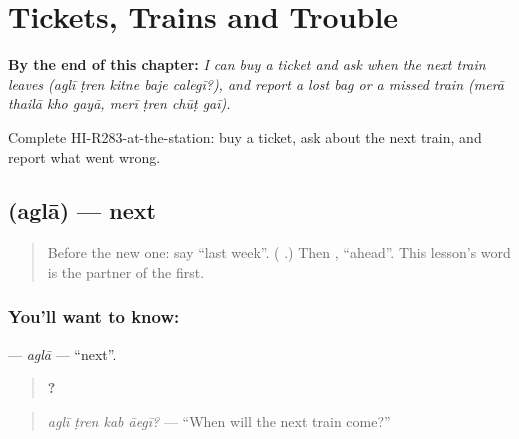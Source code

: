 
\chapter{Tickets, Trains and Trouble}
\label{ch:hi-tickets-trains-and-trouble}

\begin{chapteropening}
\textbf{By the end of this chapter:} \emph{I can buy a ticket and ask when the next train leaves (aglī ṭren kitne baje calegī?), and report a lost bag or a missed train (merā thailā kho gayā, merī ṭren chūṭ gaī).}

Complete HI-R283-at-the-station: buy a ticket, ask about the next train, and report what went wrong.
\end{chapteropening}

\section[\texorpdfstring{\hi{अगला} (aglā)}{अगला (aglā)}]{ (aglā) — next}

\label{lesson:HI-C283-agla}



\begin{quote}
Before the new one: say \textquotedblleft{}last week\textquotedblright{}. (\textbf{ }.) Then \textbf{}, \textquotedblleft{}ahead\textquotedblright{}. This lesson's word is the partner of the first.
\end{quote}

\subsection*{You'll want to know: }
\textbf{} — \emph{aglā} — \textquotedblleft{}next\textquotedblright{}.

\begin{quote}
\textbf{   ?}
\end{quote}

\begin{quote}
\emph{aglī ṭren kab āegī?} — \textquotedblleft{}When will the next train come?\textquotedblright{}
\end{quote}

